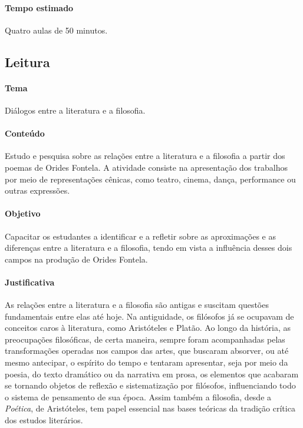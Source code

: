 \documentclass[12pt]{extarticle}
\begin{document}
\paragraph{Tempo estimado} Quatro aulas de 50 minutos.

\subsection{Leitura}

\paragraph{Tema} Diálogos entre a literatura e a filosofia.

\paragraph{Conteúdo} Estudo e pesquisa sobre as relações entre a
literatura e a filosofia a partir dos poemas de Orides Fontela. A
atividade consiste na apresentação dos trabalhos por meio de
representações cênicas, como teatro, cinema, dança, performance ou
outras expressões.

\paragraph{Objetivo} Capacitar os estudantes a identificar e a refletir
sobre as aproximações e as diferenças entre a literatura e a filosofia,
tendo em vista a influência desses dois campos na produção de Orides
Fontela.

\paragraph{Justificativa} As relações entre a literatura e a filosofia são
antigas e suscitam questões fundamentais entre elas até hoje. Na
antiguidade, os filósofos já se ocupavam de conceitos caros à
literatura, como Aristóteles e Platão. Ao longo da história, as
preocupações filosóficas, de certa maneira, sempre foram acompanhadas
pelas transformações operadas nos campos das artes, que buscaram
absorver, ou até mesmo antecipar, o espírito do tempo e tentaram
apresentar, seja por meio da poesia, do texto dramático ou da narrativa
em prosa, os elementos que acabaram se tornando objetos de reflexão e
sistematização por filósofos, influenciando todo o sistema de pensamento
de sua época. Assim também a filosofia, desde a \emph{Poética}, de
Aristóteles, tem papel essencial nas bases teóricas da tradição crítica
dos estudos literários.
\end{document}

